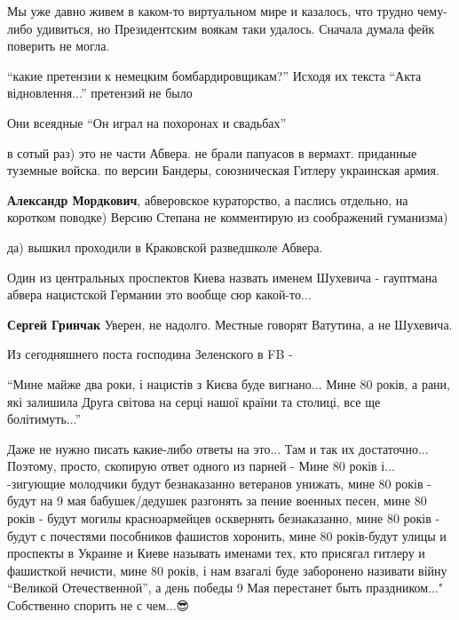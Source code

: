 \begin{itemize}

Мы уже давно живем в каком-то виртуальном мире и казалось, что трудно чему-либо
удивиться, но Президентским воякам таки удалось. Сначала думала фейк поверить
не могла.


\enquote{какие претензии к немецким бомбардировщикам?} Исходя их текста \enquote{Акта відновлення...} претензий не было


Они всеядные
\enquote{Он играл на похоронах и свадьбах}


в сотый раз) это не части Абвера. не брали папуасов в вермахт. приданные
туземные войска.  по версии Бандеры, союзническая Гитлеру украинская армия.

\begin{itemize}

\textbf{Александр Мордкович}, абверовское кураторство, а паслись отдельно, на
коротком поводке) Версию Степана не комментирую из соображений гуманизма)

да) вышкил проходили в Краковской разведшколе Абвера.

\end{itemize}

Один из центральных проспектов Киева назвать именем Шухевича - гауптмана абвера нацистской Германии это вообще сюр какой-то...

\textbf{Сергей Гринчак} Уверен, не надолго. Местные говорят Ватутина, а не Шухевича.


Из сегодняшнего поста господина Зеленского в FB -

\enquote{Мине майже два роки, і нацистів з Києва буде вигнано...
Мине 80 років, а рани, які залишила Друга світова на серці нашої країни та столиці,
все ще болітимуть...}

Даже не нужно писать какие-либо ответы на это... Там и так их достаточно... Поэтому, просто, скопирую ответ одного из парней -
Мине 80 років і... -зигующие молодчики будут безнаказанно ветеранов унижать,
мине 80 років - будут на 9 мая бабушек/дедушек разгонять за пение военных
песен, мине 80 років - будут могилы красноармейцев осквернять безнаказанно,
мине 80 років - будут с почестями пособников фашистов хоронить, мине 80
років-будут улицы и проспекты в Украине и Киеве называть именами тех, кто
присягал гитлеру и фашисткой нечисти, мине 80 років, і нам взагалі буде
заборонено називати війну \enquote{Великой Отечественной}, а день победы 9 Мая
перестанет быть праздником..." Собственно спорить не с чем...😎


\end{itemize}
